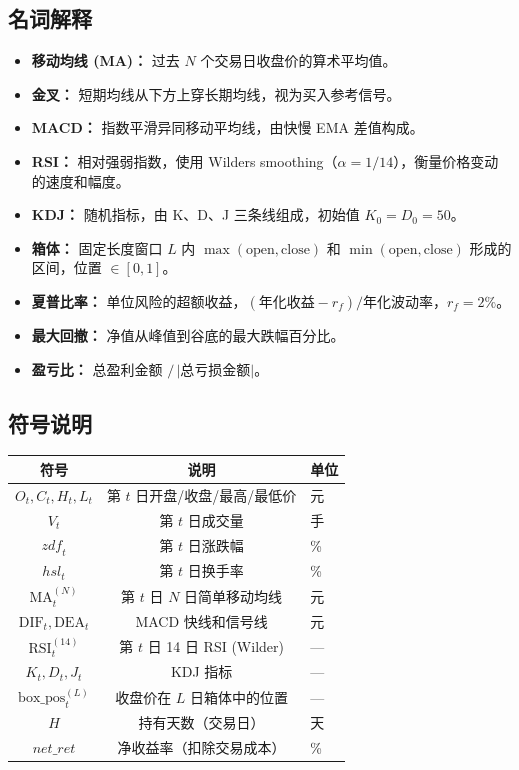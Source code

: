 \documentclass[12pt,a4paper]{ctexart}
\numberwithin{figure}{section}
\numberwithin{table}{section}
\begin{document}
\subsection{名词解释}
\begin{itemize}[leftmargin=*]
    \item {\bfseries 移动均线 (MA)：} 过去 $N$ 个交易日收盘价的算术平均值。
    \item {\bfseries 金叉：} 短期均线从下方上穿长期均线，视为买入参考信号。
    \item {\bfseries MACD：} 指数平滑异同移动平均线，由快慢 EMA 差值构成。
    \item {\bfseries RSI：} 相对强弱指数，使用 Wilders smoothing（$\alpha=1/14$），衡量价格变动的速度和幅度。
    \item {\bfseries KDJ：} 随机指标，由 K、D、J 三条线组成，初始值 $K_0=D_0=50$。
    \item {\bfseries 箱体：} 固定长度窗口 $L$ 内 $\max(\text{open},\text{close})$ 和 $\min(\text{open},\text{close})$ 形成的区间，位置 $\in[0,1]$。
    \item {\bfseries 夏普比率：} 单位风险的超额收益，$(\text{年化收益} - r_f) / \text{年化波动率}$，$r_f=2\%$。
    \item {\bfseries 最大回撤：} 净值从峰值到谷底的最大跌幅百分比。
    \item {\bfseries 盈亏比：} 总盈利金额 $/\,|$总亏损金额$|$。
\end{itemize}

\subsection{符号说明}
\begin{center}
\begin{tabular}{ccl}
\toprule
符号 & 说明 & 单位 \\
\midrule
$O_t, C_t, H_t, L_t$ & 第 $t$ 日开盘/收盘/最高/最低价 & 元 \\
$V_t$ & 第 $t$ 日成交量 & 手 \\
$\mathit{zdf}_t$ & 第 $t$ 日涨跌幅 & \% \\
$\mathit{hsl}_t$ & 第 $t$ 日换手率 & \% \\
$\text{MA}_t^{(N)}$ & 第 $t$ 日 $N$ 日简单移动均线 & 元 \\
$\text{DIF}_t, \text{DEA}_t$ & MACD 快线和信号线 & 元 \\
$\text{RSI}_t^{(14)}$ & 第 $t$ 日 14 日 RSI (Wilder) & — \\
$K_t, D_t, J_t$ & KDJ 指标 & — \\
$\text{box\_pos}_t^{(L)}$ & 收盘价在 $L$ 日箱体中的位置 & — \\
$H$ & 持有天数（交易日） & 天 \\
$\mathit{net\_ret}$ & 净收益率（扣除交易成本） & \% \\
\bottomrule
\end{tabular}
\end{center}
\end{document}
